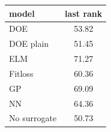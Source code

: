 \begin{tabular}{|lc|}
\hline
model & last rank\\
\hline
DOE & 53.82 \\
DOE plain & 51.45 \\
ELM & 71.27 \\
Fitloss & 60.36 \\
GP & 69.09 \\
NN & 64.36 \\
No surrogate & 50.73 \\
\hline
\end{tabular}
